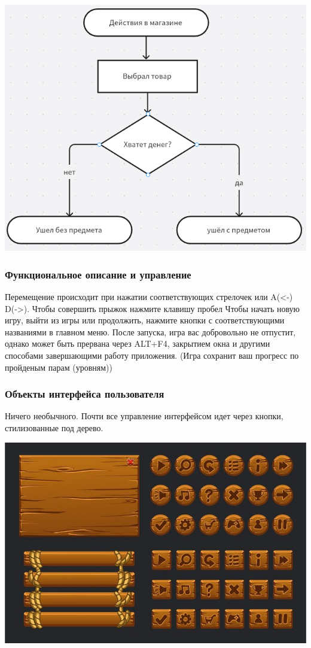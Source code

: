 \documentclass{article}
\begin{document}
\includegraphics[width=1\linewidth]{images/Bs-store.png}
\subsubsection{Функциональное описание и управление}
Перемещение происходит при нажатии соответствующих стрелочек или A(<-) D(->). Чтобы совершить прыжок нажмите клавишу пробел
Чтобы начать новую игру, выйти из игры или продолжить, нажмите кнопки с соответствующими названиями в главном меню. После запуска, игра вас добровольно не отпустит, однако может быть прервана через ALT+F4, закрытием окна и другими способами завершающими работу приложения. (Игра сохранит ваш прогресс по пройденым парам (уровням))


\subsubsection{Объекты интерфейса пользователя}
Ничего необычного. Почти все управление интерфейсом идет через кнопки, стилизованные под дерево.

\includegraphics[width=1\linewidth]{images/buttons.jpg}
\end{document}
